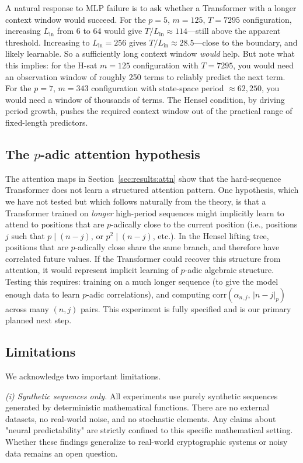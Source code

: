 \documentclass[11pt]{article}
\theoremstyle{plain}
\theoremstyle{definition}
\newcommand{\absp}[1]{\lvert #1 \rvert_p}
\begin{document}
A natural response to MLP failure is to ask whether a Transformer with a longer context window would succeed. For the $p=5$, $m=125$, $T=7295$ configuration, increasing $L_{\mathrm{in}}$ from 6 to 64 would give $T/L_{\mathrm{in}} \approx 114$---still above the apparent threshold. Increasing to $L_{\mathrm{in}} = 256$ gives $T/L_{\mathrm{in}} \approx 28.5$---close to the boundary, and likely learnable. So a sufficiently long context window \emph{would} help. But note what this implies: for the H-sat $m=125$ configuration with $T = 7295$, you would need an observation window of roughly 250 terms to reliably predict the next term. For the $p=7$, $m=343$ configuration with state-space period $\approx 62{,}250$, you would need a window of thousands of terms. The Hensel condition, by driving period growth, pushes the required context window out of the practical range of fixed-length predictors.

\subsection{The $p$-adic attention hypothesis}

The attention maps in Section~\ref{sec:results:attn} show that the hard-sequence Transformer does not learn a structured attention pattern. One hypothesis, which we have not tested but which follows naturally from the theory, is that a Transformer trained on \emph{longer} high-period sequences might implicitly learn to attend to positions that are $p$-adically close to the current position (i.e., positions $j$ such that $p \mid (n-j)$, or $p^2 \mid (n-j)$, etc.). In the Hensel lifting tree, positions that are $p$-adically close share the same branch, and therefore have correlated future values. If the Transformer could recover this structure from attention, it would represent implicit learning of $p$-adic algebraic structure. Testing this requires: training on a much longer sequence (to give the model enough data to learn $p$-adic correlations), and computing $\mathrm{corr}(\alpha_{n,j},\, \absp{n-j})$ across many $(n,j)$ pairs. This experiment is fully specified and is our primary planned next step.

\subsection{Limitations}

We acknowledge two important limitations. 

\textit{(i) Synthetic sequences only.} All experiments use purely synthetic sequences generated by deterministic mathematical functions. There are no external datasets, no real-world noise, and no stochastic elements. Any claims about "neural predictability" are strictly confined to this specific mathematical setting. Whether these findings generalize to real-world cryptographic systems or noisy data remains an open question.
\end{document}
